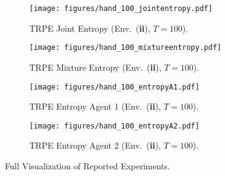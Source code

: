 \begin{figure*}[]
\begin{subfigure}[b]{0.245\textwidth}
        \texttt{[image: figures/hand\_100\_jointentropy.pdf]}
        \caption{\centering TRPE Joint Entropy (Env.~(\textbf{ii}), $T=100$).}
        \label{subfig:imagea1}
    \end{subfigure}
    \hfill
    \begin{subfigure}[b]{0.245\textwidth}
        \texttt{[image: figures/hand\_100\_mixtureentropy.pdf]}
        \caption{\centering TRPE Mixture Entropy (Env.~(\textbf{ii}), $T=100$).}
        \label{subfig:imagea2}
    \end{subfigure}
    \hfill
    \begin{subfigure}[b]{0.245\textwidth}
        \centering
        \texttt{[image: figures/hand\_100\_entropyA1.pdf]}
        \caption{\centering TRPE Entropy Agent 1 (Env.~(\textbf{ii}), $T=100$).}
        \label{subfig:image11}
    \end{subfigure}
    \hfill
    \begin{subfigure}[b]{0.245\textwidth}
        \centering
        \texttt{[image: figures/hand\_100\_entropyA2.pdf]}
        \caption{\centering TRPE Entropy Agent 2 (Env.~(\textbf{ii}), $T=100$).}
        \label{subfig:image11}
    \end{subfigure}
\caption{\centering Full Visualization of Reported Experiments.}
\label{fig:pretraining}
\end{figure*}

